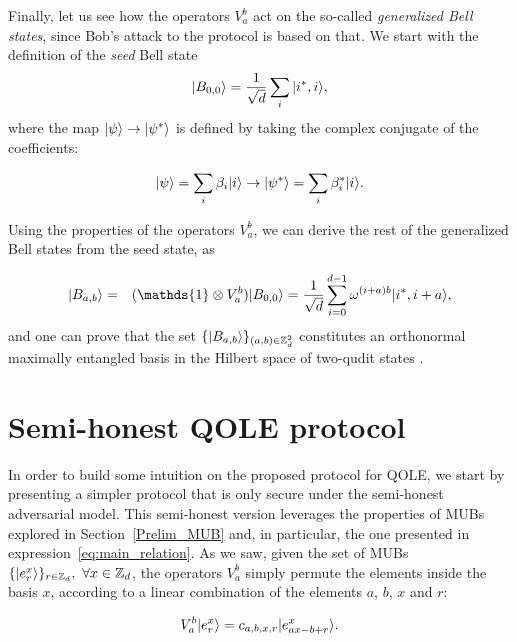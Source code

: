 Finally, let us see how the operators $V^b_a$ act on the so-called \textit{generalized Bell states}, since Bob's attack to the protocol is based on that. We start with the definition of the \textit{seed} Bell state 
\begin{equation*}
    | B_{0,0} \rangle = \frac{1}{\sqrt{d}}\sum_{i} | i^*, i \rangle,\label{eq:Bellseed}
\end{equation*}
where the map $| \psi \rangle\rightarrow| \psi^* \rangle$ is defined by taking the complex conjugate of the coefficients:

$$| \psi \rangle = \sum_i \beta_i | i \rangle\rightarrow | \psi^* \rangle = \sum_i \beta_i^* | i \rangle.$$

Using the properties of the operators $V_a^b$, we can derive the rest of the generalized Bell states from the seed state, as

\begin{eqnarray}
\ket{B_{a,b}} &=& (\mathds{1} \otimes V^b_a) \ket{B_{0,0}} = \frac{1}{\sqrt{d}} \sum_{i=0}^{d-1} \omega^{(i+a)b} \ket{i^*, i+a}, \label{eq:bob_attack}
\end{eqnarray}
and one can prove that the set $\{| B_{a, b} \rangle\}_{(a,b) \in\mathbb{Z}_d^2}$ constitutes an orthonormal maximally entangled basis in the Hilbert space of two-qudit states \cite{DEBZ10}.



\section{Semi-honest QOLE protocol}\label{insecureQOLE}

 In order to build some intuition on the proposed protocol for QOLE, we start by presenting a simpler protocol that is only secure under the semi-honest adversarial model. This semi-honest version leverages the properties of MUBs explored in Section~\ref{Prelim_MUB} and, in particular, the one presented in expression~\eqref{eq:main_relation}. As we saw, given the set of MUBs $\{ | e^x_r \rangle \}_{r\in\mathbb{Z}_d},\ \forall x\in\mathbb{Z}_d$, the operators $V^b_a$ simply permute the elements inside the basis $x$, according to a linear combination of the elements $a$, $b$, $x$ and $r$:

\begin{equation}
V^b_a | e^x_r \rangle = c_{a, b, x, r} | e^x_{ax - b +r} \rangle.
\label{eq:main_ingredient}
\end{equation}

